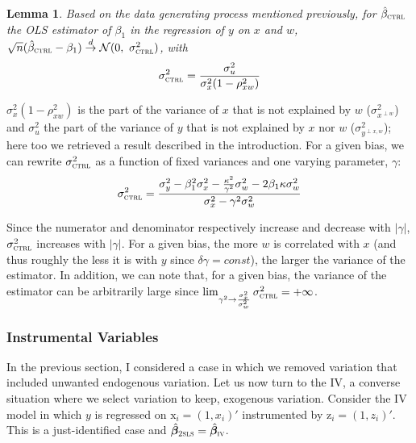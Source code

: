 \documentclass[usletter, 12pt]{article}
\newtheorem{lemma}{Lemma}
\begin{document}
				\begin{lemma}\label{lemma_ctrl}
					Based on the data generating process mentioned previously, for $\hat{\beta}_{\textsc{ctrl}}$ the OLS estimator of $\beta_{1}$ in the regression of $y$ on $x$ and $w$, $\sqrt{n} ( \hat{\beta}_{\textsc{ctrl}} - \beta_{1}) \overset{d}{\to} \mathcal{N}(0, \ \sigma_{\textsc{ctrl}}^{2})$, with
					\[
						\sigma_{\textsc{ctrl}}^{2} = \dfrac{\sigma_{u}^{2}}{ \sigma_{x}^{2} (1 - \rho_{xw}^{2})}
					\]
				\end{lemma}
				
				$\sigma_{x}^{2} (1 - \rho_{xw}^{2})$ is the part of the variance of $x$ that is not explained by $w$ ($\sigma^{2}_{x^{\perp w}}$) and $\sigma_{u}^{2}$ the part of the variance of $y$ that is not explained by $x$ nor $w$ ($\sigma^{2}_{y^{\perp x, w}}$); here too we retrieved a result described in the introduction. For a given bias, we can rewrite $\sigma_{\textsc{ctrl}}^{2}$ as a function of fixed variances and one varying parameter, $\gamma$:
				~
				\[
					\sigma_{\textsc{ctrl}}^{2} = \dfrac{\sigma_{y}^{2} - \beta_{1}^{2}\sigma_{x}^{2} - \frac{\kappa^{2}}{\gamma^{2}}\sigma_{w}^{2} - 2\beta_{1}\kappa \sigma_{w}^{2}}{\sigma_{x}^{2}  - \gamma^{2} \sigma_{w}^{2}}
				\]
				
				Since the numerator and denominator respectively increase and decrease with $|\gamma|$,  $\sigma_{\textsc{ctrl}}^{2}$ increases with $|\gamma|$. For a given bias, the more $w$ is correlated with $x$ (and thus roughly the less it is with $y$ since $\delta \gamma = const$), the larger the variance of the estimator. In addition, we can note that, for a given bias, the variance of the estimator can be arbitrarily large since $\lim_{\gamma^{2} \to \frac{\sigma_{x}^{2}}{\sigma_{w}^{2}}} \sigma_{\textsc{ctrl}}^{2} = + \infty$.
				
			
		
		\subsubsection{Instrumental Variables}
		
			In the previous section, I considered a case in which we removed variation that included unwanted endogenous variation. Let us now turn to the IV, a converse situation where we select variation to keep, exogenous variation. Consider the IV model in which $y$ is regressed on $\text{x}_{i} = (1, x_{i})'$ instrumented by $\text{z}_{i} = (1, z_{i})'$. This is a just-identified case and $\hat{\bm{\beta}}_{\textsc{2sls}} = \hat{\bm{\beta}}_{\textsc{iv}}$.		
							
\end{document}
